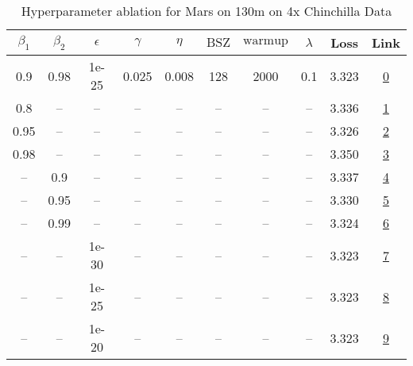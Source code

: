 \begin{table}[H]
\centering
\caption{Hyperparameter ablation for Mars on 130m on 4x Chinchilla Data}
\label{tab:ablation_mars_130m_4}
\begin{tabular}{cccccccccc}
\toprule
$\beta_1$ & $\beta_2$ & $\epsilon$ & $\gamma$ & $\eta$ & $\mathrm{BSZ}$ & $\mathrm{warmup}$ & $\lambda$ & Loss & Link \\
\midrule
0.9 & 0.98 & 1e-25 & 0.025 & 0.008 & 128 & 2000 & 0.1 & 3.323 & \href{https://wandb.ai/stanford-mercury/optimizer-scaling/runs/sweep-130m-10B-marsb8cf3flr0.008-wd0.1-minlr0-warmup2000-b10.9-b-5a2278}{0} \\
\midrule
0.8 & -- & -- & -- & -- & -- & -- & -- & 3.336 & \href{https://wandb.ai/stanford-mercury/optimizer-scaling/runs/sweep-130m-10B-marsa0cf09lr0.008-wd0.1-minlr0-warmup2000-b10.8-b-2eb328}{1} \\
0.95 & -- & -- & -- & -- & -- & -- & -- & 3.326 & \href{https://wandb.ai/stanford-mercury/optimizer-scaling/runs/sweep-130m-10B-mars1ddcddlr0.008-wd0.1-minlr0-warmup2000-b10.95--f05d16}{2} \\
0.98 & -- & -- & -- & -- & -- & -- & -- & 3.350 & \href{https://wandb.ai/stanford-mercury/optimizer-scaling/runs/sweep-130m-10B-mars1125cblr0.008-wd0.1-minlr0-warmup2000-b10.98--06efb4}{3} \\
-- & 0.9 & -- & -- & -- & -- & -- & -- & 3.337 & \href{https://wandb.ai/stanford-mercury/optimizer-scaling/runs/sweep-130m-10B-marsbf9ae8lr0.008-wd0.1-minlr0-warmup2000-b10.9-b-77968a}{4} \\
-- & 0.95 & -- & -- & -- & -- & -- & -- & 3.330 & \href{https://wandb.ai/stanford-mercury/optimizer-scaling/runs/sweep-130m-10B-marsa8c868lr0.008-wd0.1-minlr0-warmup2000-b10.9-b-e43f81}{5} \\
-- & 0.99 & -- & -- & -- & -- & -- & -- & 3.324 & \href{https://wandb.ai/stanford-mercury/optimizer-scaling/runs/sweep-130m-10B-mars7e0a59lr0.008-wd0.1-minlr0-warmup2000-b10.9-b-53135f}{6} \\
-- & -- & 1e-30 & -- & -- & -- & -- & -- & 3.323 & \href{https://wandb.ai/stanford-mercury/optimizer-scaling/runs/sweep-130m-10B-marsb8cf3flr0.008-wd0.1-minlr0-warmup2000-b10.9-b-5a2278}{7} \\
-- & -- & 1e-25 & -- & -- & -- & -- & -- & 3.323 & \href{https://wandb.ai/stanford-mercury/optimizer-scaling/runs/sweep-130m-10B-marsb8cf3flr0.008-wd0.1-minlr0-warmup2000-b10.9-b-5a2278}{8} \\
-- & -- & 1e-20 & -- & -- & -- & -- & -- & 3.323 & \href{https://wandb.ai/stanford-mercury/optimizer-scaling/runs/sweep-130m-10B-marsb20ec1lr0.008-wd0.1-minlr0-warmup2000-b10.9-b-429792}{9} \\

\end{tabular}
\end{table}
